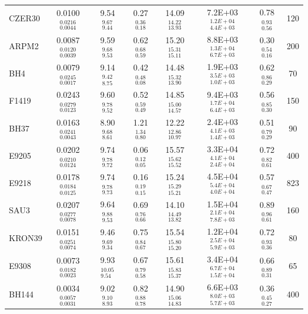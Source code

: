 \documentclass[draft]{aa}
\begin{document}
\begin{table}
\begin{tabular}{lccccccc}
  CZER30 & 0.0100$_{0.0044}^{0.0216}$ & 9.54 $_{9.44}^{9.67 }$ & 0.27$_{0.18}^{0.36}$ &
  14.09$_{13.93}^{14.22}$ & 7.2E+03$_{4.4E+03}^{1.2E+04}$ & 0.78$_{0.56}^{0.93}$ &
  120 \\[.2cm]
  ARPM2 & 0.0087$_{0.0039}^{0.0120}$ & 9.59 $_{9.53}^{9.68 }$ & 0.62$_{0.59}^{0.68}$ &
  15.20$_{15.11}^{15.31}$ & 8.8E+03$_{6.7E+03}^{1.3E+04}$ & 0.30$_{0.16}^{0.54}$ &
  200 \\[.2cm]
  BH4 & 0.0079$_{0.0017}^{0.0245}$ & 9.14 $_{8.75}^{9.42 }$ & 0.42$_{0.08}^{0.48}$ &
  14.48$_{13.90}^{15.32}$ & 1.9E+03$_{1.0E+03}^{3.5E+03}$ & 0.62$_{0.29}^{0.86}$ &
  70 \\[.2cm]
  F1419 & 0.0243$_{0.0123}^{0.0279}$ & 9.60 $_{9.52}^{9.78 }$ & 0.52$_{0.49}^{0.59}$ &
  14.85$_{14.57}^{15.00}$ & 9.4E+03$_{6.4E+03}^{1.7E+04}$ & 0.56$_{0.30}^{0.85}$ &
  150 \\[.2cm]
  BH37 & 0.0163$_{0.0043}^{0.0241}$ & 8.90 $_{8.61}^{9.68 }$ & 1.21$_{0.80}^{1.34}$ &
  12.22$_{10.97}^{12.86}$ & 2.4E+03$_{1.4E+03}^{4.1E+03}$ & 0.51$_{0.29}^{0.79}$ &
  90 \\[.2cm]
  E9205 & 0.0202$_{0.0124}^{0.0210}$ & 9.74 $_{9.72}^{9.78 }$ & 0.06$_{0.05}^{0.12}$ &
  15.57$_{15.52}^{15.62}$ & 3.3E+04$_{2.4E+04}^{4.1E+04}$ & 0.72$_{0.61}^{0.82}$ &
  400 \\[.2cm]
  E9218 & 0.0178$_{0.0125}^{0.0184}$ & 9.74 $_{9.73}^{9.78 }$ & 0.16$_{0.15}^{0.19}$ &
  15.24$_{15.21}^{15.29}$ & 4.5E+04$_{4.0E+04}^{5.4E+04}$ & 0.57$_{0.47}^{0.67}$ &
  823 \\[.2cm]
  SAU3 & 0.0207$_{0.0078}^{0.0277}$ & 9.64 $_{9.53}^{9.88 }$ & 0.69$_{0.66}^{0.76}$ &
  14.10$_{13.82}^{14.49}$ & 1.5E+04$_{7.8E+03}^{2.1E+04}$ & 0.89$_{0.61}^{0.96}$ &
  160 \\[.2cm]
  KRON39 & 0.0151$_{0.0074}^{0.0251}$ & 9.46 $_{9.34}^{9.69 }$ & 0.75$_{0.67}^{0.84}$ &
  15.54$_{15.20}^{15.80}$ & 1.2E+04$_{5.9E+03}^{2.5E+04}$ & 0.72$_{0.36}^{0.93}$ &
  80 \\[.2cm]
  E9308 & 0.0073$_{0.0023}^{0.0182}$ & 9.93 $_{9.54}^{10.05}$ & 0.67$_{0.58}^{0.79}$ &
  15.61$_{15.37}^{15.83}$ & 3.4E+04$_{1.5E+04}^{6.7E+04}$ & 0.66$_{0.31}^{0.89}$ &
  65 \\[.2cm]
  BH144 & 0.0034$_{0.0031}^{0.0057}$ & 9.02 $_{8.93}^{9.10 }$ & 0.82$_{0.78}^{0.88}$ &
  14.90$_{14.83}^{15.06}$ & 6.6E+03$_{5.7E+03}^{8.0E+03}$ & 0.36$_{0.27}^{0.45}$ &
  400 \\[.2cm]

\end{tabular}
\end{table}
\end{document}
